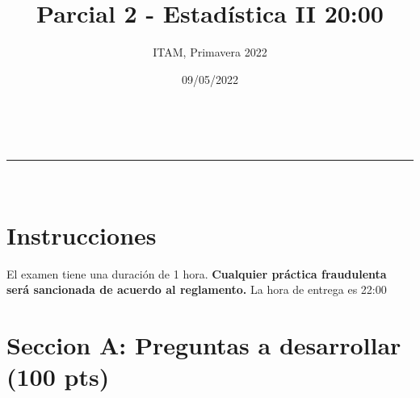 \documentclass[addpoints]{exam}
\makeatletter
\newcommand{\linia}{\rule{\linewidth}{0.5pt}}
\theoremstyle{mytheor}
\renewcommand{\maketitle}{
    \begin{center}
    \vspace{2ex}
    {\huge \textsc{\@title}}
    \vspace{1ex}
    \\
    \linia\\
    \@author \hfill \@date
    \vspace{4ex}
    \end{center}
  }
\makeatother
\begin{document}
  
  \title{Parcial 2 - Estadística II 20:00}
  
  \author{ITAM, Primavera 2022}
  
  \date{09/05/2022}
  
  \maketitle
  
  \section*{Instrucciones}
 

\vspace{10pt}
  
El examen tiene una duración de 1 hora. \textbf{Cualquier práctica fraudulenta será sancionada de acuerdo al reglamento.} La hora de entrega es 22:00 

\section*{Seccion A: Preguntas a desarrollar (100 pts)}
  
\end{document}
